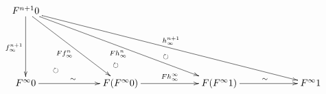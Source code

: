 \documentclass[12pt]{article}
\begin{document}
\pagestyle{empty}

\begin{align*}
  \vcenter{
    \xymatrix@=60pt{
      F^{n + 1} 0
      \ar@{->}[d]_{f^{n + 1}_\infty}
      \ar@/_30pt/@{{}{ }{}}[rd]|{\circlearrowright}
      \ar@{->}[rd]_{F f^n_\infty}
      \ar@/_20pt/@{{}{ }{}}[rrd]|{\circlearrowright}
      \ar@{->}[rrd]_{F h^n_\infty}
      \ar@/_10pt/@{{}{ }{}}[rrrd]|{\circlearrowright}
      \ar@{->}[rrrd]^{h^{n + 1}_\infty}
      \\
      F^\infty 0
      \ar@{->}[r]^{\sim}
      &
      F (F^\infty 0)
      \ar@{->}[r]^{F h^\infty_\infty}
      &
      F (F^\infty 1)
      \ar@{->}[r]^{\sim}
      &
      F^\infty 1
    }
  }
\end{align*}
\end{document}
